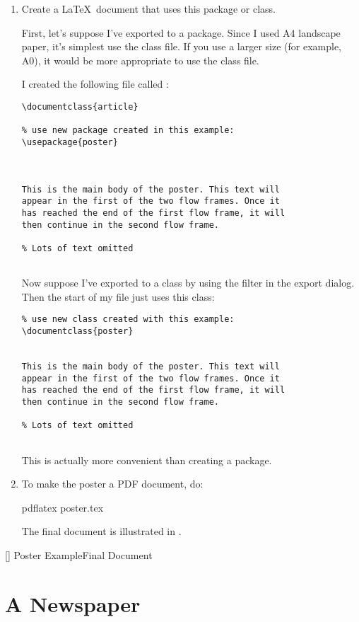 \begin{enumerate}
\item Create a \LaTeX\ document that uses this package or class.

First, let's suppose I've exported to a package. Since I
used A4 landscape paper, it's simplest use the 
class file. If you use a larger size (for example, A0), it would be more
appropriate to use the  class file.

I created the following file called :
\begin{verbatim}
\documentclass{article}

% use new package created in this example:
\usepackage{poster}



This is the main body of the poster. This text will
appear in the first of the two flow frames. Once it
has reached the end of the first flow frame, it will 
then continue in the second flow frame.

% Lots of text omitted


\end{verbatim}

Now suppose I've exported to a class by using the
 filter in the export dialog. Then the start of my
 file just uses this class:
\begin{verbatim}
% use new class created with this example:
\documentclass{poster}


This is the main body of the poster. This text will
appear in the first of the two flow frames. Once it
has reached the end of the first flow frame, it will 
then continue in the second flow frame.

% Lots of text omitted


\end{verbatim}
This is actually more convenient than creating a package.

\item To make the poster a PDF document, do:
\begin{terminal}
pdflatex poster.tex
\end{terminal}%
The final document is illustrated in .
\end{enumerate}

[]
{}
{Poster Example\dash Final Document}

\section{A Newspaper}\label{sec:newstutorial}


